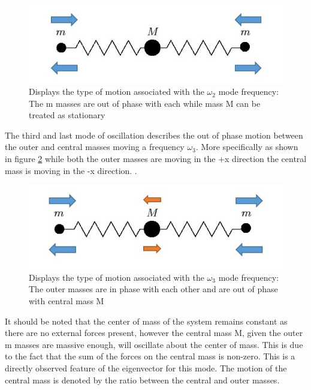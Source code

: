 \documentclass[hidelinks]{article}
\begin{document}
\begin{multicols}{2}
\begin{figure}[H]
\centering
\includegraphics[width=\linewidth]{10-1}
\caption{Displays the type of motion associated with the $\omega_2$ mode frequency: The m masses are out of phase with each while mass M can be treated as stationary}
\label{mode2}
\end{figure}

The third and last mode of oscillation describes the out of phase motion between the outer and central masses moving a frequency $\omega_3$. More specifically as shown in figure \ref{mode3} while both the outer masses are moving in the +x direction the central mass is moving in the -x direction. .

\begin{figure}[H]
\centering
\includegraphics[width=\linewidth]{1-11}
\caption{Displays the type of motion associated with the $\omega_3$ mode frequency: The outer masses are in phase with each other and are out of phase with central mass M}
\label{mode3}
\end{figure}

It should be noted that the center of mass of the system remains constant as there are no external forces present, however the central mass M, given the outer m masses are massive enough, will oscillate about the center of mass. This is due to the fact that the sum of the forces on the central mass is non-zero. This is a directly observed feature of the eigenvector for this mode. The motion of the central mass is denoted by the ratio between the central and outer masses.




\end{multicols}
\end{document}
